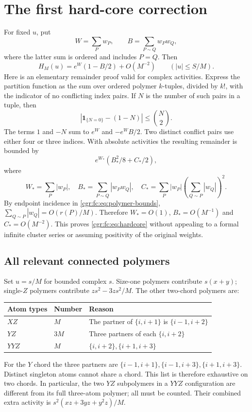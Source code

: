 \documentclass[11pt,letterpaper]{article}
\numberwithin{equation}{section}
\theoremstyle{definition}\newtheorem{definition}[theorem]{Definition}
\theoremstyle{remark}\newtheorem{remark}[theorem]{Remark}
\newcommand{\one}{\mathbf1}
\begin{document}
\section{The first hard-core correction}\label{cgr:fc:sec:hardcore}
For fixed $u$, put
\[
 W=\sum_Pw_P,\qquad B=\sum_{P\sim Q}w_Pw_Q,
\]
where the latter sum is ordered and includes $P=Q$. Then
\begin{equation}\label{cgr:fc:eq:hardcore}
 H_M(u)=e^W(1-B/2)+O(M^{-2})\qquad(|u|\le S/M).
\end{equation}
Here is an elementary remainder proof valid for complex activities.
Express the partition function as the sum over ordered polymer
$k$-tuples, divided by $k!$, with the indicator of no conflicting
index pairs. If $N$ is the number of such pairs in a tuple, then
\[
 \left|\one_{\{N=0\}}-(1-N)\right|\le\binom N2.
\]
The terms $1$ and $-N$ sum to $e^W$ and $-e^WB/2$.
Two distinct conflict pairs use either four or three indices.
With absolute activities the resulting remainder is bounded by
\begin{equation}\label{cgr:fc:eq:two-conflicts}
 e^{W_*}(B_*^2/8+C_*/2),
\end{equation}
where
\[
 W_*=\sum_P|w_P|,\quad B_* =\sum_{P\sim Q}|w_Pw_Q|,
 \quad C_* =\sum_P|w_P|\left(\sum_{Q\sim P}|w_Q|\right)^2.
\]
By endpoint incidence in \eqref{cgr:fc:eq:polymer-bounds},
$\sum_{Q\sim P}|w_Q|=O(r(P)/M)$. Therefore $W_*=O(1)$,
$B_*=O(M^{-1})$ and $C_*=O(M^{-2})$. This proves
\eqref{cgr:fc:eq:hardcore} without appealing to a formal infinite cluster
series or assuming positivity of the original weights.

\subsection{All relevant connected polymers}
Set $u=s/M$ for bounded complex $s$. Size-one polymers contribute
$s(x+y)$; single-$Z$ polymers contribute
$zs^2-3zs^2/M$. The other two-chord polymers are:
\begin{center}
\begin{tabular}{@{}lll@{}}
\toprule
Atom types & Number & Reason\\
\midrule
$XZ$ & $M$ & The partner of $\{i,i+1\}$ is $\{i-1,i+2\}$\\
$YZ$ & $3M$ & Three partners of each $\{i,i+2\}$\\
$YYZ$ & $M$ & $\{i,i+2\},\{i+1,i+3\}$\\
\bottomrule
\end{tabular}
\end{center}
For the $Y$ chord the three partners are
$\{i-1,i+1\},\{i-1,i+3\},\{i+1,i+3\}$.
Distinct singleton atoms cannot share a chord. This list is
therefore exhaustive on two chords. In particular, the two $YZ$
subpolymers in a $YYZ$ configuration are different from its full
three-atom polymer; all must be counted. Their combined extra
activity is $s^2(xz+3yz+y^2z)/M$.
\end{document}
